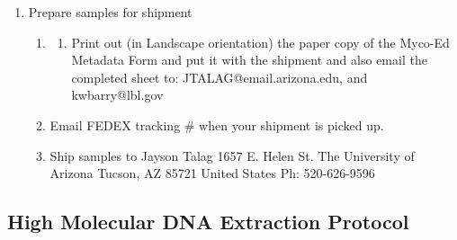 \documentclass[
  letterpaper,
  DIV=11,
  numbers=noendperiod]{scrreprt}
\providecommand{\tightlist}{%
  \setlength{\itemsep}{0pt}\setlength{\parskip}{0pt}}
\begin{document}
\begin{enumerate}
  \begin{enumerate}
  \def\labelenumii{\alph{enumii}.}
  \tightlist
  \item
    Once all required metadata is provided, download a copy to excel
  \item
    Email a copy to Jayson at (jtalag@ag.arizona.edu ) and Kerrie
    (kwbarry@lbl.gov).
  \item
    Include in the subject line of your email ``MyCoEd 509937''
    {[}Professor's Name{]}{[}University/Institution{]} ``Sample
    Submission''
  \item
    Include in your email your name, your college/university, the exact
    name of your samples (column D) that are ready to ship to AGI (and
    the rows in this sheet).
  \item
    Wait for approval/confirmation from AGI \& JGI.

    \begin{enumerate}
    \def\labelenumiii{\roman{enumiii}.}
    \tightlist
    \item
      If needed make requested changed and email updated copy
    \end{enumerate}
  \end{enumerate}
\item
  Prepare samples for shipment

  \begin{enumerate}
  \def\labelenumii{\alph{enumii}.}
  \tightlist
  \item
    \begin{enumerate}
    \def\labelenumiii{\Alph{enumiii})}
    \tightlist
    \item
      Print out (in Landscape orientation) the paper copy of the Myco-Ed
      Metadata Form and put it with the shipment and also email the
      completed sheet to: JTALAG@email.arizona.edu, and kwbarry@lbl.gov
    \end{enumerate}
  \item
    Email FEDEX tracking \# when your shipment is picked up.
  \item
    Ship samples to Jayson Talag 1657 E. Helen St. The University of
    Arizona Tucson, AZ 85721 United States Ph: 520-626-9596
  \end{enumerate}
\end{enumerate}

\subsection*{High Molecular DNA Extraction
Protocol}\label{high-molecular-dna-extraction-protocol}
\end{document}
